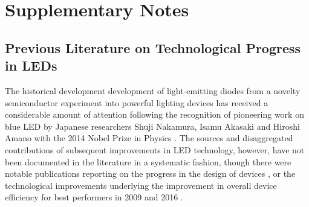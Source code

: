 \documentclass[parskip=full]{article}
\begin{document}
\setlength{\fboxsep}{10pt}

\tableofcontents

\clearpage

\section{Supplementary Notes}

\subsection{Previous Literature on Technological Progress in LEDs}
\label{sec:prev_lit}

The historical development development of light-emitting diodes from a novelty semiconductor experiment into powerful lighting devices has received a considerable amount of attention following the recognition of pioneering work on blue LED by Japanese researchers Shuji Nakamura, Isamu Akasaki and Hiroshi Amano with the 2014 Nobel Prize in Physics \cite{Nakamura2015}. The sources and disaggregated contributions of subsequent improvements in LED technology, however, have not been documented in the literature in a systematic fashion, though there were notable publications reporting on the progress in the design of devices \cite{Shchekin2006,krames2007led,laubsch2009high,hahn2014development}, or the technological improvements  underlying the improvement in overall device efficiency for best performers in 2009 \cite{tsao2010solid} and 2016 \cite{pattison2017solid}. 
\end{document}
